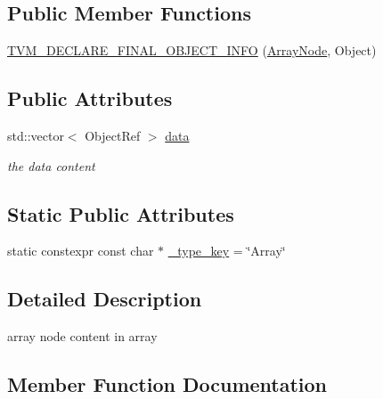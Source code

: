 \subsection*{Public Member Functions}
\begin{DoxyCompactItemize}
\item 
\hyperlink{classtvm_1_1ArrayNode_a70f730ac25dc44057db0fec77b58b297}{T\+V\+M\+\_\+\+D\+E\+C\+L\+A\+R\+E\+\_\+\+F\+I\+N\+A\+L\+\_\+\+O\+B\+J\+E\+C\+T\+\_\+\+I\+N\+FO} (\hyperlink{classtvm_1_1ArrayNode}{Array\+Node}, Object)
\end{DoxyCompactItemize}
\subsection*{Public Attributes}
\begin{DoxyCompactItemize}
\item 
std\+::vector$<$ Object\+Ref $>$ \hyperlink{classtvm_1_1ArrayNode_a4bb8934345a35142365c296caac04e8f}{data}
\begin{DoxyCompactList}\small\item\em the data content \end{DoxyCompactList}\end{DoxyCompactItemize}
\subsection*{Static Public Attributes}
\begin{DoxyCompactItemize}
\item 
static constexpr const char $\ast$ \hyperlink{classtvm_1_1ArrayNode_af9cb38fb40d44e3351abb28c4042c43c}{\+\_\+type\+\_\+key} = \char`\"{}Array\char`\"{}
\end{DoxyCompactItemize}


\subsection{Detailed Description}
array node content in array 

\subsection{Member Function Documentation}
